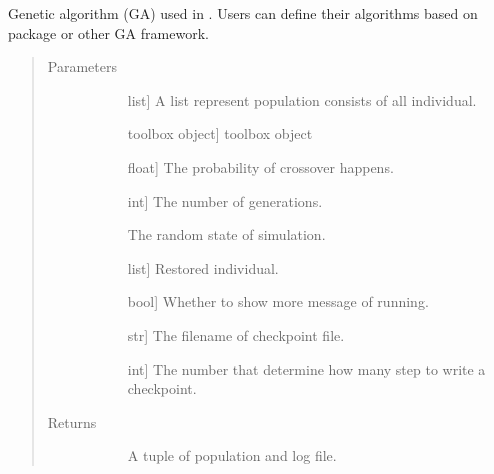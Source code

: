 \documentclass[letterpaper,10pt,english]{sphinxmanual}
\begin{document}

\begin{fulllineitems}
\label{\detokenize{pygace:pygace.ga.gaceGA}}
Genetic algorithm (GA) used in . Users can define their algorithms
based on  package or other GA framework.
\begin{quote}\begin{description}
\item[{Parameters}] \leavevmode\begin{description}
\item[{}] \leavevmode{[}list{]}
A list represent population consists of all individual.

\item[{}] \leavevmode{[}toolbox object{]}
 toolbox object

\item[{}] \leavevmode{[}float{]}
The probability of crossover happens.

\item[{}] \leavevmode{[}int{]}
The number of generations.

\item[{}] \leavevmode
The random state of simulation.

\item[{}] \leavevmode{[}list{]}
Restored individual.

\item[{}] \leavevmode{[}bool{]}
Whether to show more message of running.

\item[{}] \leavevmode{[}str{]}
The filename of checkpoint file.

\item[{}] \leavevmode{[}int{]}
The number that determine how many step to write a checkpoint.

\end{description}

\item[{Returns}] \leavevmode\begin{description}
\item[{}] \leavevmode
A tuple of population and log file.

\end{description}

\end{description}\end{quote}

\end{fulllineitems}
\end{document}
